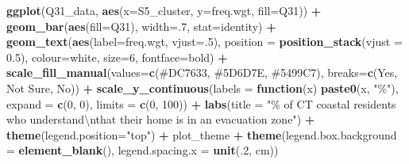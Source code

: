 \documentclass[
]{book}
\newenvironment{Shaded}{\begin{snugshade}}{\end{snugshade}}
\newcommand{\CharTok}[1]{\textcolor[rgb]{0.31,0.60,0.02}{#1}}
\newcommand{\ControlFlowTok}[1]{\textcolor[rgb]{0.13,0.29,0.53}{\textbf{#1}}}
\newcommand{\DataTypeTok}[1]{\textcolor[rgb]{0.13,0.29,0.53}{#1}}
\newcommand{\DecValTok}[1]{\textcolor[rgb]{0.00,0.00,0.81}{#1}}
\newcommand{\FloatTok}[1]{\textcolor[rgb]{0.00,0.00,0.81}{#1}}
\newcommand{\KeywordTok}[1]{\textcolor[rgb]{0.13,0.29,0.53}{\textbf{#1}}}
\newcommand{\NormalTok}[1]{#1}
\newcommand{\OperatorTok}[1]{\textcolor[rgb]{0.81,0.36,0.00}{\textbf{#1}}}
\newcommand{\StringTok}[1]{\textcolor[rgb]{0.31,0.60,0.02}{#1}}
\begin{document}
\begin{Shaded}
\begin{Highlighting}[]
\KeywordTok{ggplot}\NormalTok{(Q31\_data, }\KeywordTok{aes}\NormalTok{(}\DataTypeTok{x=}\NormalTok{S5\_cluster, }\DataTypeTok{y=}\NormalTok{freq.wgt, }\DataTypeTok{fill=}\NormalTok{Q31)) }\OperatorTok{+}
\StringTok{  }\KeywordTok{geom\_bar}\NormalTok{(}\KeywordTok{aes}\NormalTok{(}\DataTypeTok{fill=}\NormalTok{Q31), }\DataTypeTok{width=}\NormalTok{.}\DecValTok{7}\NormalTok{, }\DataTypeTok{stat=}\StringTok{\textquotesingle{}identity\textquotesingle{}}\NormalTok{) }\OperatorTok{+}
\StringTok{  }\KeywordTok{geom\_text}\NormalTok{(}\KeywordTok{aes}\NormalTok{(}\DataTypeTok{label=}\NormalTok{freq.wgt, }\DataTypeTok{vjust=}\NormalTok{.}\DecValTok{5}\NormalTok{), }\DataTypeTok{position =} \KeywordTok{position\_stack}\NormalTok{(}\DataTypeTok{vjust =} \FloatTok{0.5}\NormalTok{), }\DataTypeTok{colour=}\StringTok{\textquotesingle{}white\textquotesingle{}}\NormalTok{, }\DataTypeTok{size=}\DecValTok{6}\NormalTok{, }\DataTypeTok{fontface=}\StringTok{\textquotesingle{}bold\textquotesingle{}}\NormalTok{) }\OperatorTok{+}
\StringTok{  }\KeywordTok{scale\_fill\_manual}\NormalTok{(}\DataTypeTok{values=}\KeywordTok{c}\NormalTok{(}\StringTok{\textquotesingle{}\#DC7633\textquotesingle{}}\NormalTok{, }\StringTok{\textquotesingle{}\#5D6D7E\textquotesingle{}}\NormalTok{, }\StringTok{\textquotesingle{}\#5499C7\textquotesingle{}}\NormalTok{), }\DataTypeTok{breaks=}\KeywordTok{c}\NormalTok{(}\StringTok{\textquotesingle{}Yes\textquotesingle{}}\NormalTok{, }\StringTok{\textquotesingle{}Not Sure\textquotesingle{}}\NormalTok{, }\StringTok{\textquotesingle{}No\textquotesingle{}}\NormalTok{)) }\OperatorTok{+}
\StringTok{  }\KeywordTok{scale\_y\_continuous}\NormalTok{(}\DataTypeTok{labels =} \ControlFlowTok{function}\NormalTok{(x) }\KeywordTok{paste0}\NormalTok{(x, }\StringTok{"\%"}\NormalTok{), }\DataTypeTok{expand =} \KeywordTok{c}\NormalTok{(}\DecValTok{0}\NormalTok{, }\DecValTok{0}\NormalTok{), }\DataTypeTok{limits =} \KeywordTok{c}\NormalTok{(}\DecValTok{0}\NormalTok{, }\DecValTok{100}\NormalTok{)) }\OperatorTok{+}
\StringTok{  }\KeywordTok{labs}\NormalTok{(}\DataTypeTok{title =} \StringTok{"\% of CT coastal residents who understand}\CharTok{\textbackslash{}n}\StringTok{that their home is in an evacuation zone"}\NormalTok{) }\OperatorTok{+}
\StringTok{  }\KeywordTok{theme}\NormalTok{(}\DataTypeTok{legend.position=}\StringTok{"top"}\NormalTok{) }\OperatorTok{+}
\StringTok{  }\NormalTok{plot\_theme }\OperatorTok{+}\StringTok{ }\KeywordTok{theme}\NormalTok{(}\DataTypeTok{legend.box.background =} \KeywordTok{element\_blank}\NormalTok{(), }\DataTypeTok{legend.spacing.x =} \KeywordTok{unit}\NormalTok{(.}\DecValTok{2}\NormalTok{, }\StringTok{\textquotesingle{}cm\textquotesingle{}}\NormalTok{))}
\end{Highlighting}
\end{Shaded}
\end{document}
